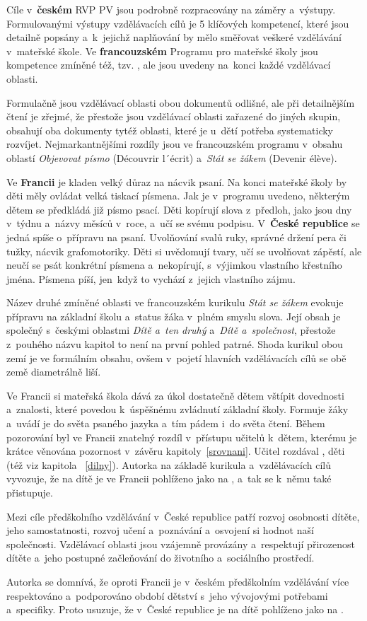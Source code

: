 	Cíle v~\textbf{českém} RVP PV jsou podrobně rozpracovány na záměry a~výstupy. Formulovanými výstupy vzdělávacích cílů je 5 klíčových kompetencí, které jsou detailně popsány a~k jejichž naplňování by mělo směřovat veškeré vzdělávání v~mateřské škole. Ve \textbf{francouzském} Programu pro mateřské školy jsou kompetence zmíněné též, tzv. , ale jsou uvedeny na konci každé vzdělávací oblasti.

	Formulačně jsou vzdělávací oblasti obou dokumentů odlišné, ale při detailnějším čtení je zřejmé, že přestože jsou vzdělávací oblasti zařazené do jiných skupin, obsahují oba dokumenty tytéž oblasti, které je u~dětí potřeba systematicky rozvíjet. Nejmarkantnějšími rozdíly jsou ve francouzském programu v~obsahu oblastí \textit{Objevovat písmo} (Découvrir l´écrit) a~\textit{Stát se žákem} (Devenir élève).

	Ve \textbf{Francii} je kladen velký důraz na nácvik psaní. Na konci mateřské školy by děti měly ovládat velká tiskací písmena. Jak je v programu uvedeno, některým dětem se předkládá již písmo psací. Děti kopírují slova z~předloh, jako jsou dny v týdnu a~názvy měsíců v roce, a~učí se svému podpisu. V \textbf{České republice} se jedná spíše o~přípravu na psaní. Uvolňování svalů ruky, správné držení pera či tužky, nácvik grafomotoriky. Děti si uvědomují tvary, učí se uvolňovat zápěstí, ale neučí se psát konkrétní písmena a~nekopírují, s~výjimkou vlastního křestního jména. Písmena píší, jen když to vychází z jejich vlastního zájmu. 

	Název druhé zmíněné oblasti ve francouzském kurikulu \textit{Stát se žákem} evokuje přípravu na základní školu a~status žáka v~plném smyslu slova. Její obsah je společný s českými oblastmi \textit{Dítě a~ten druhý} a~\textit{Dítě a~společnost}, přestože z~pouhého názvu kapitol to není na první pohled patrné. Shoda kurikul obou zemí je ve formálním obsahu, ovšem v~pojetí hlavních vzdělávacích cílů se obě země diametrálně liší.

	Ve Francii si mateřská škola dává za úkol dostatečně dětem vštípit dovednosti a znalosti, které povedou k~úspěšnému zvládnutí základní školy. Formuje žáky a~uvádí je do světa psaného jazyka a~tím pádem i~do světa čtení. Během pozorování byl ve Francii znatelný rozdíl v~přístupu učitelů k~dětem, kterému je krátce věnována pozornost v~závěru kapitoly~\ref{srovnani}. Učitel rozdával , děti  (též viz kapitola ~\ref{dilny}). Autorka na základě kurikula a~vzdělávacích cílů vyvozuje, že na dítě je ve Francii pohlíženo jako na , a~tak se k~němu také přistupuje. 

	Mezi cíle předškolního vzdělávání v~České republice patří rozvoj osobnosti dítěte, jeho samostatnosti, rozvoj učení a~poznávání a~osvojení si hodnot naší společnosti. Vzdělávací oblasti jsou vzájemně provázány a~respektují přirozenost dítěte a~jeho postupné začleňování do životního a~sociálního prostředí. 

	Autorka se domnívá, že oproti Francii je v~českém předškolním vzdělávání více respektováno a~podporováno období dětství s~jeho vývojovými potřebami a~specifiky. Proto usuzuje, že v~České republice je na dítě pohlíženo jako na .
